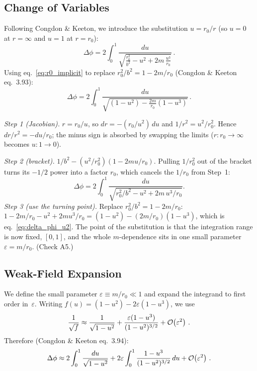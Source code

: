 \subsection{Change of Variables}
\label{sec:substitution}

Following Congdon \& Keeton, we introduce the substitution $u = r_0 / r$
(so $u = 0$ at $r = \infty$ and $u = 1$ at $r = r_0$):
\begin{equation}
    \Delta\phi = 2 \int_0^1
    \frac{du}{\sqrt{\displaystyle
    \frac{r_0^2}{b^2} - u^2 + 2m\,\frac{u^3}{r_0}}} \,.
    \label{eq:delta_phi_u}
\end{equation}
Using eq.~\eqref{eq:r0_implicit} to replace $r_0^2/b^2 = 1 - 2m/r_0$
(Congdon \& Keeton eq.~3.93):
\begin{equation}
    \Delta\phi = 2 \int_0^1
    \frac{du}{\sqrt{\displaystyle
    (1 - u^2) - \frac{2m}{r_0}(1 - u^3)}} \,.
    \label{eq:delta_phi_u2}
\end{equation}


\begin{derivation}[The substitution $u = r_0/r$ in full]
\textit{Step 1 (Jacobian).}  $r = r_0/u$, so $dr = -(r_0/u^2)\,du$ and
$1/r^2 = u^2/r_0^2$.  Hence $dr/r^2 = -du/r_0$; the minus sign is absorbed by
swapping the limits ($r: r_0 \to \infty$ becomes $u: 1 \to 0$).

\textit{Step 2 (bracket).}  $1/b^2 - (u^2/r_0^2)(1 - 2mu/r_0)$.  Pulling
$1/r_0^2$ out of the bracket turns its $-1/2$ power into a factor $r_0$, which
cancels the $1/r_0$ from Step~1:
\[
    \Delta\phi = 2\int_0^1 \frac{du}{\sqrt{r_0^2/b^2 - u^2 + 2m\,u^3/r_0}} .
\]
\textit{Step 3 (use the turning point).}  Replace $r_0^2/b^2 = 1 - 2m/r_0$:
$1 - 2m/r_0 - u^2 + 2m u^3/r_0 = (1-u^2) - (2m/r_0)(1-u^3)$, which is
eq.~\eqref{eq:delta_phi_u2}.  The point of the substitution is that the
integration range is now fixed, $[0,1]$, and the whole $m$-dependence sits in one
small parameter $\varepsilon = m/r_0$.  (Check A5.)
\end{derivation}
\subsection{Weak-Field Expansion}
\label{sec:weak_field_expansion_deflection}

We define the small parameter $\varepsilon \equiv m/r_0 \ll 1$ and expand
the integrand to first order in~$\varepsilon$.  Writing
$f(u) = (1-u^2) - 2\varepsilon(1 - u^3)$, we use
\begin{equation}
    \frac{1}{\sqrt{f}} \approx
    \frac{1}{\sqrt{1 - u^2}}
    + \frac{\varepsilon(1 - u^3)}{(1 - u^2)^{3/2}}
    + \mathcal{O}\!\left(\varepsilon^2\right) \,.
    \label{eq:integrand_expansion}
\end{equation}
Therefore (Congdon \& Keeton eq.~3.94):
\begin{equation}
    \Delta\phi \approx 2\int_0^1 \frac{du}{\sqrt{1 - u^2}}
    + 2\varepsilon \int_0^1 \frac{1 - u^3}{(1-u^2)^{3/2}}\, du
    + \mathcal{O}\!\left(\varepsilon^2\right) \,.
    \label{eq:delta_phi_expanded}
\end{equation}


